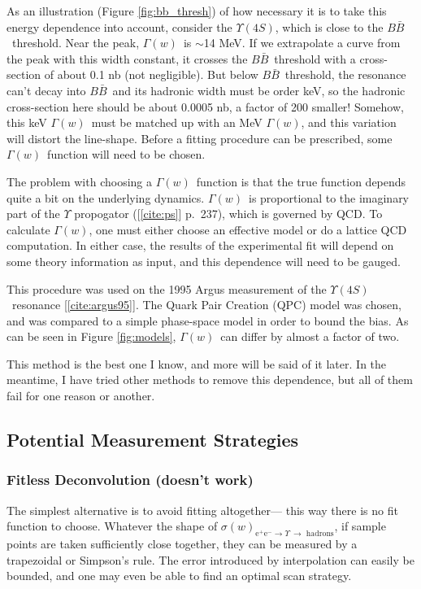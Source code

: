 \documentclass[12pt]{article}
\def\yivs{$\Upsilon(4S)$}
\def\gamofw{$\Gamma(w)$}
\def\bbar{$B\bar{B}$}
\begin{document}
As an illustration (Figure \ref{fig:bb_thresh}) of how necessary it is
to take this energy dependence into account, consider the \yivs, which
is close to the \bbar\ threshold. Near the peak, \gamofw\ is $\sim$14
MeV. If we extrapolate a curve from the peak with this width constant,
it crosses the \bbar\ threshold with a cross-section of about 0.1 nb
(not negligible). But below \bbar\ threshold, the resonance can't
decay into \bbar\ and its hadronic width must be order keV, so the
hadronic cross-section here should be about 0.0005 nb, a factor of 200
smaller! Somehow, this keV \gamofw\ must be matched up with an MeV
\gamofw, and this variation will distort the line-shape. Before a
fitting procedure can be prescribed, some \gamofw\ function will need
to be chosen.

The problem with choosing a \gamofw\ function is that the true
function depends quite a bit on the underlying dynamics. \gamofw\ is
proportional to the imaginary part of the $\Upsilon$ propogator
([\ref{cite:ps}] p.\ 237), which is governed by QCD. To calculate
\gamofw, one must either choose an effective model or do a lattice QCD
computation. In either case, the results of the experimental fit will
depend on some theory information as input, and this dependence will
need to be gauged.\label{page:old_method}

This procedure was used on the 1995 {\sc Argus} measurement of the
\yivs\ resonance [\ref{cite:argus95}]. The Quark Pair Creation (QPC)
model was chosen, and was compared to a simple phase-space model in
order to bound the bias. As can be seen in Figure \ref{fig:models},
\gamofw\ can differ by almost a factor of two.

This method is the best one I know, and more will be said of it later.
In the meantime, I have tried other methods to remove this dependence,
but all of them fail for one reason or another.

\subsection{Potential Measurement Strategies}

\subsubsection{Fitless Deconvolution (doesn't work)}

The simplest alternative is to avoid fitting altogether--- this way
there is no fit function to choose. Whatever the shape of
$\sigma(w)_{\mbox{e$^+$e$^-$} \to \Upsilon\ \to \mbox{ hadrons}}$, if
sample points are taken sufficiently close together, they can be
measured by a trapezoidal or Simpson's rule. The error introduced by
interpolation can easily be bounded, and one may even be able to find
an optimal scan strategy.
\end{document}
